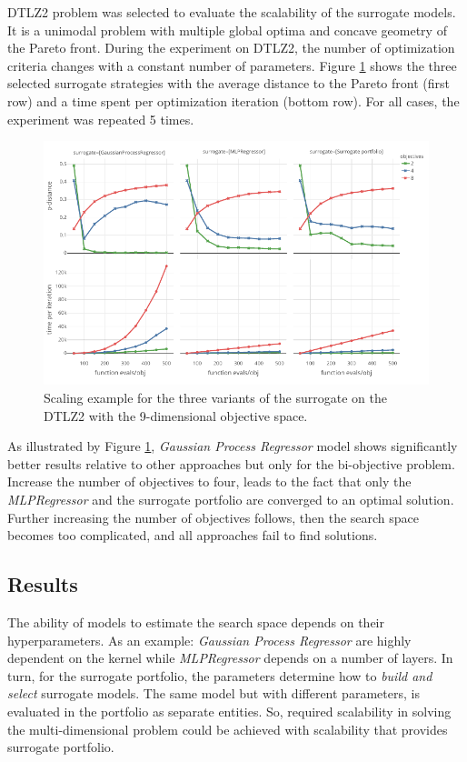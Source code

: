     DTLZ2 problem was selected to evaluate the scalability of the surrogate models. It is a unimodal problem with multiple global optima and concave geometry of the Pareto front. 
    During the experiment on DTLZ2, the number of optimization criteria changes with a constant number of parameters. Figure \ref{fig:scale_dtlz2} shows the three selected surrogate strategies with the average distance to the Pareto front (first row) and a time spent per optimization iteration (bottom row). For all cases, the experiment was repeated 5 times.

        \begin{figure}[h]
            \centering
            \includegraphics[width=\textwidth]{content/images/scale_dtlz2}
            \caption[Scaling example for the three variants of the surrogate on the DTLZ2.]{Scaling example for the three variants of the surrogate on the DTLZ2  with the 9-dimensional objective space.}
            \label{fig:scale_dtlz2}    
        \end{figure}

    As illustrated by Figure \ref{fig:scale_dtlz2}, \emph{Gaussian Process Regressor} model shows significantly better results relative to other approaches but only for the bi-objective problem. Increase the number of objectives to four, leads to the fact that only the \emph{MLPRegressor} and the surrogate portfolio are converged to an optimal solution. Further increasing the number of objectives follows, then the search space becomes too complicated, and all approaches fail to find solutions.
    
    \subsection*{Results}
    The ability of models to estimate the search space depends on their hyperparameters. As an example: \emph{Gaussian Process Regressor} are highly dependent on the kernel while \emph{MLPRegressor} depends on a number of layers.
    In turn, for the surrogate portfolio, the parameters determine how to \emph{build and select} surrogate models. The same model but with different parameters, is evaluated in the portfolio as separate entities. So, required scalability in solving the multi-dimensional problem could be achieved with scalability that provides surrogate portfolio. 



